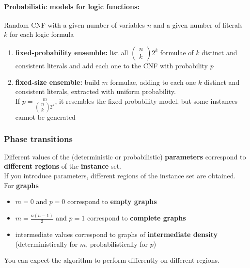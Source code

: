 \paragraph{Probabilistic models for logic functions:} Random CNF with a given number of variables $n$ and a given number of literals $k$ for each logic formula
\begin{enumerate}
	\item \textbf{fixed-probability ensemble:} list all $\left(\begin{array}{c} n \\ k\end{array}\right) 2^k$ formulae of $k$ distinct and consistent literals and add each one to the CNF with probability $p$
	\item \textbf{fixed-size ensemble:} build $m$ formulae, adding to each one $k$ distinct and consistent literals, extracted with uniform probability.\\
	If $p = \frac{m}{\left(\begin{array}{c} n \\ k\end{array}\right) 2^k}$, it resembles the fixed-probability model, but some instances cannot be generated
\end{enumerate}

\newpage

\subsubsection{Phase transitions}
Different values of the (deterministic or probabilistic) \textbf{parameters} correspond to \textbf{different regions} of the \textbf{instance} set.\\
If you introduce parameters, different regions of the instance set are obtained.\\

For \textbf{graphs}
\begin{itemize}
	\item $m = 0$ and $p = 0$ correspond to \textbf{empty graphs}
	\item $m = \frac{n(n−1)}{2}$ and $p = 1$ correspond to \textbf{complete graphs }
	\item intermediate values correspond to graphs of \textbf{intermediate density} (deterministically for $m$, probabilistically for $p$)
\end{itemize}
You can expect the algorithm to perform differently on different regions.\\


